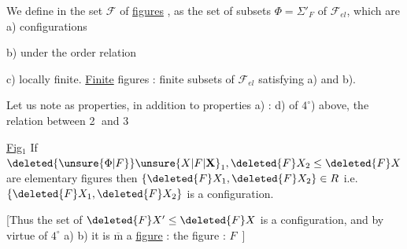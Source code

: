 
We define in the set $\mathcal{F}$ of \uline{figures} , as the set of subsets $\Phi={\Sigma}'_{F}$ of $\mathcal{F}_{el}$, which are a) configurations

b)  under the order relation

c) locally finite. \uline{Finite} figures : finite subsets of $\mathcal{F}_{el}$ satisfying a) and b).


Let us note as properties, in addition to properties a) : d) of $4^\circ$) above, the relation between \textcircled{2} and \textcircled{3}


\uline{Fig}$_1$ If $\deleted{\unsure{\Phi|F}}\unsure{X|F|\mathbf{X}}_1,\deleted{F}X_2\leq\deleted{F}X$ are elementary figures then $\{\deleted{F}X_1,\deleted{F}X_2\}\in R$ i.e. $\{\deleted{F}X_1,\deleted{F}X_2\}$ is a configuration.

[Thus the set of $\deleted{F}X'\leq\deleted{F}X$ is a configuration, and by virtue of $4^\circ$ a) b) it is $\overline{\mathrm{m}}$ a \uline{figure} : the  figure : $F$\unsure{\ldots|\,--}\ ]

